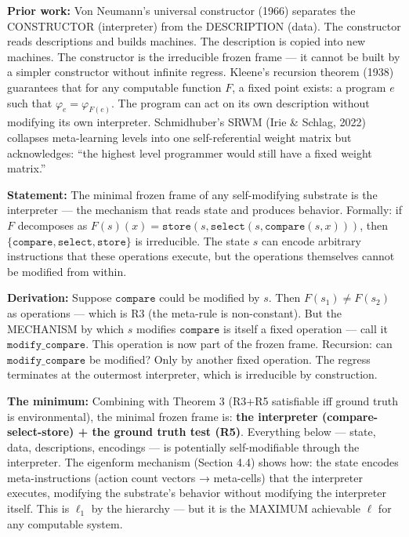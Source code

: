 \documentclass[
  11pt,
]{article}
\begin{document}
\textbf{Prior work:} Von Neumann's universal constructor (1966)
separates the CONSTRUCTOR (interpreter) from the DESCRIPTION (data). The
constructor reads descriptions and builds machines. The description is
copied into new machines. The constructor is the irreducible frozen
frame --- it cannot be built by a simpler constructor without infinite
regress. Kleene's recursion theorem (1938) guarantees that for any
computable function \(F\), a fixed point exists: a program \(e\) such
that \(\varphi_e = \varphi_{F(e)}\). The program can act on its own
description without modifying its own interpreter. Schmidhuber's SRWM
(Irie \& Schlag, 2022) collapses meta-learning levels into one
self-referential weight matrix but acknowledges: ``the highest level
programmer would still have a fixed weight matrix.''

\textbf{Statement:} The minimal frozen frame of any self-modifying
substrate is the interpreter --- the mechanism that reads state and
produces behavior. Formally: if \(F\) decomposes as
\(F(s)(x) = \texttt{store}(s, \texttt{select}(s, \texttt{compare}(s, x)))\),
then \(\{\texttt{compare}, \texttt{select}, \texttt{store}\}\) is
irreducible. The state \(s\) can encode arbitrary instructions that
these operations execute, but the operations themselves cannot be
modified from within.

\textbf{Derivation:} Suppose \(\texttt{compare}\) could be modified by
\(s\). Then \(F(s_1) \neq F(s_2)\) as operations --- which is R3 (the
meta-rule is non-constant). But the MECHANISM by which \(s\) modifies
\(\texttt{compare}\) is itself a fixed operation --- call it
\(\texttt{modify\_compare}\). This operation is now part of the frozen
frame. Recursion: can \(\texttt{modify\_compare}\) be modified? Only by
another fixed operation. The regress terminates at the outermost
interpreter, which is irreducible by construction.

\textbf{The minimum:} Combining with Theorem 3 (R3+R5 satisfiable iff
ground truth is environmental), the minimal frozen frame is: \textbf{the
interpreter (compare-select-store) + the ground truth test (R5)}.
Everything below --- state, data, descriptions, encodings --- is
potentially self-modifiable through the interpreter. The eigenform
mechanism (Section 4.4) shows how: the state encodes meta-instructions
(action count vectors → meta-cells) that the interpreter executes,
modifying the substrate's behavior without modifying the interpreter
itself. This is \(\ell_1\) by the hierarchy --- but it is the MAXIMUM
achievable \(\ell\) for any computable system.
\end{document}
